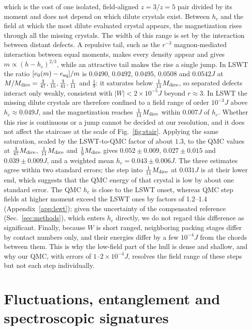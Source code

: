 \documentclass[prb,twocolumn,amsmath,amssymb,floatfix]{revtex4-2}
\newcommand{\Md}{M_{\rm dice}}
\begin{document}
which is the cost of one isolated, field-aligned $z=3$/$z=5$ pair divided by its moment and does not depend on which dilute crystals exist. Between $h_c$ and the field at which the most dilute evaluated crystal appears, the magnetization rises through all the missing crystals. The width of this range is set by the interaction between distant defects. A repulsive tail, such as the $r^{-3}$ magnon-mediated interaction between equal moments, makes every density appear and gives $m\propto(h-h_c)^{2/3}$, while an attractive tail makes the rise a single jump. In LSWT the ratio $[e_0(m)-e_{\rm sq}]/m$ is $0.0490$, $0.0492$, $0.0495$, $0.0508$ and $0.0542J$ at $M/\Md=\frac3{47},\frac1{15},\frac3{41},\frac1{11}$ and $\frac19$: it saturates below $\frac1{11}\Md$, so separated defects interact only weakly, consistent with $|W|<2\times10^{-5}J$ beyond $r\approx3$. In LSWT the missing dilute crystals are therefore confined to a field range of order $10^{-3}J$ above $h_c\approx0.049J$, and the magnetization reaches $\frac1{11}\Md$ within $0.007J$ of $h_c$. Whether this rise is continuous or a jump cannot be decided at our resolution, and it does not affect the staircase at the scale of Fig.~\ref{fig:stair}. Applying the same saturation, scaled by the LSWT-to-QMC factor of about $1.3$, to the QMC values at $\frac3{47}\Md$, $\frac1{11}\Md$ and $\frac19\Md$ gives $0.052\pm0.009$, $0.027\pm0.015$ and $0.039\pm0.009J$, and a weighted mean $h_c=0.043\pm0.006J$. The three estimates agree within two standard errors; the step into $\frac1{11}\Md$ at $0.031J$ is at their lower end, which suggests that the QMC energy of that crystal is low by about one standard error. The QMC $h_c$ is close to the LSWT onset, whereas QMC step fields at higher moment exceed the LSWT ones by factors of 1.2--1.4 (Appendix~\ref{app:lswt}); given the uncertainty of the compensated reference (Sec.~\ref{sec:methods}), which enters $h_c$ directly, we do not regard this difference as significant. Finally, because $W$ is short ranged, neighboring packing stages differ by contact numbers only, and their energies differ by a few $10^{-4}J$ from the chords between them. This is why the low-field part of the hull is dense and shallow, and why our QMC, with errors of $1$--$2\times10^{-4}J$, resolves the field range of these steps but not each step individually.



\section{Fluctuations, entanglement and spectroscopic signatures}\label{sec:fluct}
\end{document}

